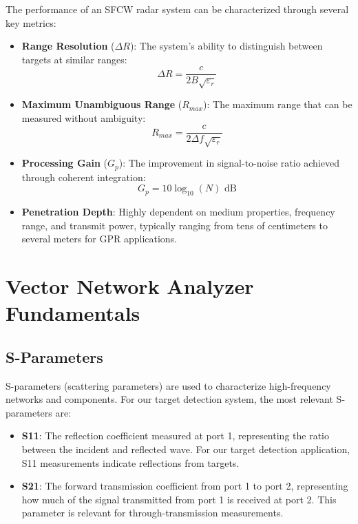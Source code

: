 \documentclass[11pt,a4paper]{article}
\begin{document}
The performance of an SFCW radar system can be characterized through several key metrics:

\begin{itemize}
    \item \textbf{Range Resolution} ($\Delta R$): The system's ability to distinguish between targets at similar ranges:
    \begin{equation}
        \Delta R = \frac{c}{2B\sqrt{\varepsilon_r}}
    \end{equation}
    
    \item \textbf{Maximum Unambiguous Range} ($R_{max}$): The maximum range that can be measured without ambiguity:
    \begin{equation}
        R_{max} = \frac{c}{2\Delta f \sqrt{\varepsilon_r}}
    \end{equation}
    
    \item \textbf{Processing Gain} ($G_p$): The improvement in signal-to-noise ratio achieved through coherent integration:
    \begin{equation}
        G_p = 10\log_{10}(N) \text{ dB}
    \end{equation}
    
    \item \textbf{Penetration Depth}: Highly dependent on medium properties, frequency range, and transmit power, typically ranging from tens of centimeters to several meters for GPR applications.
\end{itemize}

\section{Vector Network Analyzer Fundamentals}

\subsection{S-Parameters}

S-parameters (scattering parameters) are used to characterize high-frequency networks and components. For our target detection system, the most relevant S-parameters are:

\begin{itemize}
    \item \textbf{S11}: The reflection coefficient measured at port 1, representing the ratio between the incident and reflected wave. For our target detection application, S11 measurements indicate reflections from targets.
    
    \item \textbf{S21}: The forward transmission coefficient from port 1 to port 2, representing how much of the signal transmitted from port 1 is received at port 2. This parameter is relevant for through-transmission measurements.
\end{itemize}
\end{document}
